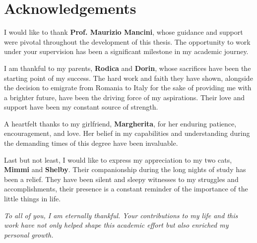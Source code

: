 %
%
\chapter*{Acknowledgements}


    I would like to thank \textbf{Prof. Maurizio Mancini}, whose guidance
    and support were pivotal throughout the development of this thesis. The opportunity to work under your supervision has been a significant milestone in my academic journey.
   
    \vspace{2mm} 
    
    \noindent I am thankful to my parents, \textbf{Rodica} and \textbf{Dorin}, whose 
    sacrifices have been the starting point of my success. The hard work and faith they have shown, alongside the decision to emigrate from Romania to Italy for the sake of providing me with a brighter future, have been the driving force of my aspirations. Their love and support have been my constant source of strength.
    
    \vspace{2mm}

    \noindent A heartfelt thanks to my girlfriend, \textbf{Margherita}, for her enduring patience, encouragement, and love. Her belief in my capabilities and understanding during the demanding times of this degree have been invaluable. 

    \vspace{2mm}
  
    \noindent Last but not least, I would like to express my appreciation to my two cats, \textbf{Mimmi} and \textbf{Shelby}. Their companionship during the long nights of study has been a relief. They have been silent and sleepy witnesses to my struggles and accomplishments, their presence is a constant reminder of the importance of the little things in life.

    \vspace{2mm}

    \textit{To all of you, I am eternally thankful. Your contributions to my life and this work have
    not only helped shape this academic effort but also enriched my personal growth.}